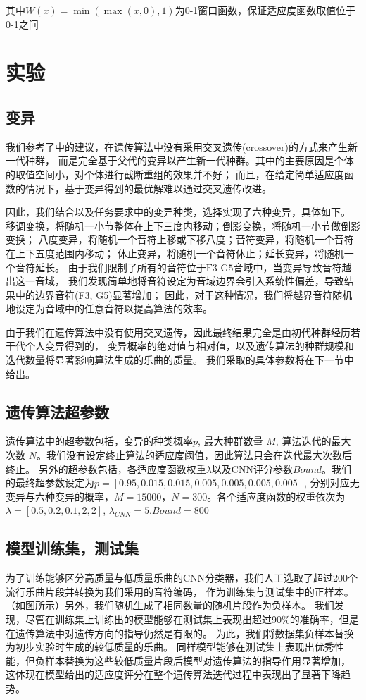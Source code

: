 \documentclass{article}
\begin{document}
其中$W(x) = \min(\max(x, 0), 1)$为0-1窗口函数，保证适应度函数取值位于0-1之间


\section{实验}
\subsection{变异}
我们参考了\cite{article2}中的建议，在遗传算法中没有采用交叉遗传(crossover)的方式来产生新一代种群，
而是完全基于父代的变异以产生新一代种群。其中的主要原因是个体的取值空间小，对个体进行截断重组的效果并不好；
而且，在给定简单适应度函数的情况下，基于变异得到的最优解难以通过交叉遗传改进。

因此，我们结合\cite{article2}以及任务要求中的变异种类，选择实现了六种变异，具体如下。
移调变换，将随机一小节整体在上下三度内移动；倒影变换，将随机一小节做倒影变换；
八度变异，将随机一个音符上移或下移八度；音符变异，将随机一个音符在上下五度范围内移动；
休止变异，将随机一个音符休止；延长变异，将随机一个音符延长。
由于我们限制了所有的音符位于$\text{F3-G5}$音域中，当变异导致音符越出这一音域，
我们发现简单地将音符设定为音域边界会引入系统性偏差，导致结果中的边界音符(F3, G5)显著增加；
因此，对于这种情况，我们将越界音符随机地设定为音域中的任意音符以提高算法的效率。

由于我们在遗传算法中没有使用交叉遗传，因此最终结果完全是由初代种群经历若干代个人变异得到的，
变异概率的绝对值与相对值，以及遗传算法的种群规模和迭代数量将显著影响算法生成的乐曲的质量。
我们采取的具体参数将在下一节中给出。

\subsection{遗传算法超参数}
遗传算法中的超参数包括，变异的种类概率$p$, 最大种群数量 $M$, 算法迭代的最大次数 $N$。我们没有设定终止算法的适应度阈值，因此算法只会在迭代最大次数后终止。
另外的超参数包括，各适应度函数权重$\lambda$以及CNN评分参数$Bound$。我们的最终超参数设定为$p = [0.95, 0.015, 0.015, 0.005, 0.005, 0.005, 0.005]$,
分别对应无变异与六种变异的概率，$M=15000， N=300$。各个适应度函数的权重依次为$\lambda = [0.5, 0.2, 0.1, 2, 2]$, $\lambda_{CNN}=5. Bound = 800$

\subsection{模型训练集，测试集}
为了训练能够区分高质量与低质量乐曲的CNN分类器，我们人工选取了超过200个流行乐曲片段并转换为我们采用的音符编码，
作为训练集与测试集中的正样本。（如图所示）另外，我们随机生成了相同数量的随机片段作为负样本。
我们发现，尽管在训练集上训练出的模型能够在测试集上表现出超过90\%的准确率，但是在遗传算法中对遗传方向的指导仍然是有限的。
为此，我们将数据集负样本替换为初步实验时生成的较低质量的乐曲。
同样模型能够在测试集上表现出优秀性能，但负样本替换为这些较低质量片段后模型对遗传算法的指导作用显著增加，
这体现在模型给出的适应度评分在整个遗传算法迭代过程中表现出了显著下降趋势。
\newpage
\end{document}
